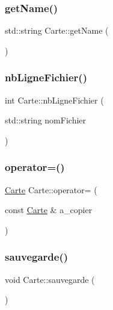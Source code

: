 \mbox{\label{class_carte_a376e889c21215615bfa3b5068f46e646}} 
\subsubsection{\texorpdfstring{get\+Name()}{getName()}}
{\footnotesize\ttfamily std\+::string Carte\+::get\+Name (\begin{DoxyParamCaption}{ }\end{DoxyParamCaption})}

\mbox{\label{class_carte_a2cd533b7b1a04298a19e7eef566bc7f1}} 
\subsubsection{\texorpdfstring{nb\+Ligne\+Fichier()}{nbLigneFichier()}}
{\footnotesize\ttfamily int Carte\+::nb\+Ligne\+Fichier (\begin{DoxyParamCaption}\item[{std\+::string}]{nom\+Fichier }\end{DoxyParamCaption})}

\mbox{\label{class_carte_a29068ef0d4091cc04a1cd66b0c84bb97}} 
\subsubsection{\texorpdfstring{operator=()}{operator=()}}
{\footnotesize\ttfamily \hyperlink{class_carte}{Carte} Carte\+::operator= (\begin{DoxyParamCaption}\item[{const \hyperlink{class_carte}{Carte} \&}]{a\+\_\+copier }\end{DoxyParamCaption})}

\mbox{\label{class_carte_aceb1051f87ed3c407bfcf25fe4cc7778}} 
\subsubsection{\texorpdfstring{sauvegarde()}{sauvegarde()}}
{\footnotesize\ttfamily void Carte\+::sauvegarde (\begin{DoxyParamCaption}{ }\end{DoxyParamCaption})}

